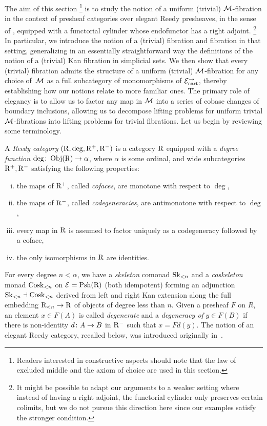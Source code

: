 \documentclass[reqno,10pt,a4paper,oneside,draft]{amsart}
\begin{document}
The aim of this section%
\footnote{Readers interested in constructive aspects should note that the law of excluded middle and the axiom of choice are used in this section.}
is to study the notion of a uniform (trivial) $\cal{M}$-fibration in the context of presheaf categories over elegant Reedy presheaves, in the sense of \cite{bergner-rezk-elegant}, equipped with a functorial cylinder whose endofunctor has a right adjoint.%
\footnote{It might be possible to adapt our arguments to a weaker setting where instead of having a right adjoint, the functorial cylinder only preserves certain colimits, but we do not pursue this direction here since our examples satisfy the stronger condition.}
In particular, we introduce the notion of a (trivial) fibration and fibration in that setting, generalizing in an essentially straightforward way the definitions of the notion of a (trivial) Kan fibration in simplicial sets.
We then show that every (trivial) fibration admits the structure of a uniform (trivial) $\cal{M}$-fibration for any choice of~$\cal{M}$ as a full subcategory of monomorphisms of $\cal{E}_{\cart}^\to$, thereby establishing how our notions relate to more familiar ones.
The primary role of elegancy is to allow us to factor any map in $\cal{M}$ into a series of cobase changes of boundary inclusions, allowing us to decompose lifting problems for uniform trivial $\cal{M}$-fibrations into lifting problems for trivial fibrations.
Let us begin by reviewing some terminology.

\begin{definition} A \emph{Reedy category} $(\R, \deg, \Rp, \Rm)$ is a category $\R$ equipped with a \emph{degree function} $\deg \co \obj(\R) \to \alpha$, where $\alpha$ is some ordinal, and wide subcategories $\Rp, \Rm$ satisfying the following properties:
\begin{enumerate}[(i)]
\item the maps of $\Rp$, called \emph{cofaces}, are monotone with respect to $\deg$,
\item the maps of $\Rm$, called \emph{codegeneracies}, are antimonotone with respect to $\deg$,
\item every map in $\R$ is assumed to factor uniquely as a codegeneracy followed by a coface,
\item the only isomorphisms in $\R$ are identities.
\end{enumerate}
\end{definition}

For every degree $n < \alpha$, we have a \emph{skeleton} comonad $\Sk_{<n}$ and a \emph{coskeleton} monad $\Cosk_{<n}$ on $\catE = \Psh(\R)$ (both idempotent) forming an adjunction $\Sk_{<n} \dashv \Cosk_{<n}$ derived from left and right Kan extension along the full embedding $\R_{<n} \to \R$ of objects of degree less than $n$.
Given a presheaf $F$ on $R$, an element $x \in F(A)$ is called \emph{degenerate} and a \emph{degeneracy of} $y \in F(B)$ if there is non-identity $d \co A \to B$ in $\Rm$ such that $x = Fd(y)$.
The notion of an elegant Reedy category, recalled below, was introduced originally in~\cite{bergner-rezk-elegant}.
\end{document}

